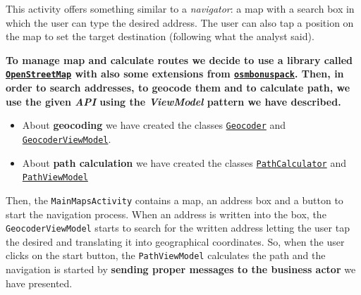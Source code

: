 This activity offers something similar to a \textit{navigator}: a map with a search box in which the user can type the desired address. The user can also tap a position on the map to set the target destination (following what the analyst said).

\begin{tcolorbox}
	\begin{center}
		\textbf{
			To manage map and calculate routes we decide to use a library called \href{https://github.com/osmdroid/osmdroid}{\texttt{OpenStreetMap}} with also some extensions from \href{https://github.com/MKergall/osmbonuspack}{\texttt{osmbonuspack}}.
			Then, in order to search addresses, to geocode them and to calculate path, we use the given \textit{API} using the \textit{ViewModel} pattern we have described.
		}
	\end{center}
\end{tcolorbox}

\begin{itemize}
	\item About \textbf{geocoding} we have created the classes \href{https://github.com/LucaLand/MobileSystemsProject-LL/blob/0.9.1/app/src/main/java/it/unibo/mobilesystems/geo/Geocoder.kt}{\texttt{Geocoder}} and \href{https://github.com/LucaLand/MobileSystemsProject-LL/blob/0.9.1/app/src/main/java/it/unibo/mobilesystems/geo/GeocoderViewModel.kt}{\texttt{GeocoderViewModel}}.
	
	\item About \textbf{path calculation} we have created the classes \href{https://github.com/LucaLand/MobileSystemsProject-LL/blob/0.9.1/app/src/main/java/it/unibo/mobilesystems/geo/PathCalculator.kt}{\texttt{PathCalculator}} and \href{https://github.com/LucaLand/MobileSystemsProject-LL/blob/0.9.1/app/src/main/java/it/unibo/mobilesystems/geo/PathViewModel.kt}{\texttt{PathViewModel}}
\end{itemize}

Then, the \texttt{MainMapsActivity} contains a map, an address box and a button to start the navigation process. When an address is written into the box, the \texttt{GeocoderViewModel} starts to search for the written address letting the user tap the desired and translating it into geographical coordinates.
So, when the user clicks on the start button, the \texttt{PathViewModel} calculates the path and the navigation is started by \textbf{sending proper messages to the business actor} we have presented.

